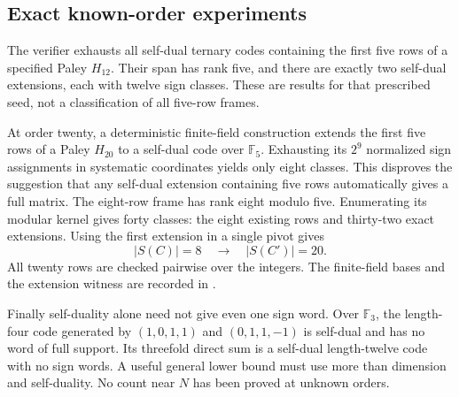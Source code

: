 \subsection{Exact known-order experiments}
The verifier exhausts all self-dual ternary codes containing the
first five rows of a specified Paley $H_{12}$. Their span has rank
five, and there are exactly two self-dual extensions, each with
twelve sign classes. These are results for that prescribed seed,
not a classification of all five-row frames.

At order twenty, a deterministic finite-field construction extends
the first five rows of a Paley $H_{20}$ to a self-dual code over
$\mathbb F_5$. Exhausting its $2^9$ normalized sign assignments in
systematic coordinates yields only eight classes. This disproves
the suggestion that any self-dual extension containing five rows
automatically gives a full matrix. The eight-row frame has rank
eight modulo five. Enumerating its modular kernel gives forty
classes: the eight existing rows and thirty-two exact extensions.
Using the first extension in a single pivot gives
\[
             |S(C)|=8\quad\longrightarrow\quad |S(C')|=20.
\]
All twenty rows are checked pairwise over the integers.
The finite-field bases and the extension witness are recorded in
.

Finally self-duality alone need not give even one sign word.
Over $\mathbb F_3$, the length-four code generated by
$(1,0,1,1)$ and $(0,1,1,-1)$ is self-dual and has no word of full
support. Its threefold direct sum is a self-dual length-twelve code
with no sign words. A useful general lower bound must use more than
dimension and self-duality. No count near $N$ has been proved at
unknown orders.
